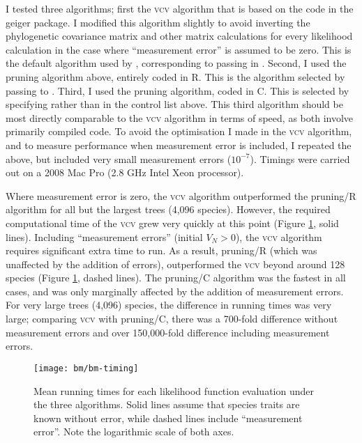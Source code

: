 \documentclass[12pt,twoside]{article}
\begin{document}
I tested three algorithms; first the \textsc{vcv} algorithm that is
based on the code in the geiger package.  I modified this algorithm
slightly to avoid inverting the phylogenetic covariance matrix and
other matrix calculations for every likelihood calculation in the case
where ``measurement error'' is assumed to be zero.  This is the
default algorithm used by , corresponding to passing in
.
%
Second, I used the pruning algorithm above, entirely coded in R.  This
is the algorithm selected by passing
 to .
Third, I used the pruning algorithm, coded in C.  This is selected by
specifying  rather than  in the control
list above.  This third algorithm should be most directly comparable
to the \textsc{vcv} algorithm in terms of speed, as both involve
primarily compiled code.
%
To avoid the optimisation I made in the \textsc{vcv} algorithm, and to
measure performance when measurement error is included, I repeated the
above, but included very small measurement errors ($10^{-7}$).
%
Timings were carried out on a 2008 Mac Pro (2.8 GHz Intel Xeon
processor).

Where measurement error is zero, the \textsc{vcv} algorithm
outperformed the pruning/R algorithm for all but the largest trees
(4,096 species).  However, the required computational time of the
\textsc{vcv} grew very quickly at this point (Figure
\ref{fig:bm-performance}, solid lines).
%
Including ``measurement errors'' (initial $V_N > 0$), the \textsc{vcv}
algorithm requires significant extra time to run.  As a result,
pruning/R (which was unaffected by the addition of errors),
outperformed the \textsc{vcv} beyond around 128 species (Figure
\ref{fig:bm-performance}, dashed lines).
%
The pruning/C algorithm was the fastest in all cases, and was only
marginally affected by the addition of measurement errors.
%
For very large trees (4,096) species, the difference in running times
was very large; comparing \textsc{vcv} with pruning/C, there was a
700-fold difference without measurement errors and over 150,000-fold
difference including measurement errors.

\begin{figure}[p]
  \centering
  \texttt{[image: bm/bm-timing]}
  \caption[Performance of Brownian motion likelihood algorithms]{Mean
    running times for each likelihood function evaluation under the
    three algorithms.  Solid lines assume that species traits are
    known without error, while dashed lines include ``measurement
    error''.  Note the logarithmic scale of both axes.}
  \label{fig:bm-performance}
\end{figure}
\end{document}
